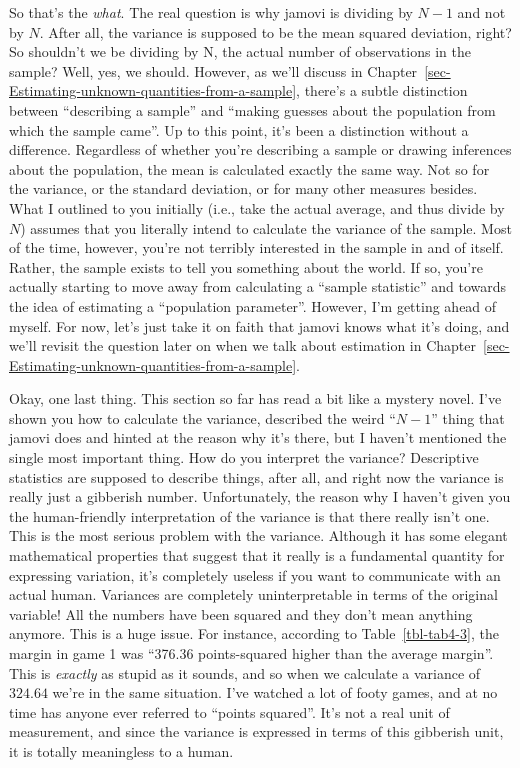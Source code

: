 \documentclass[
  a4paper,
]{book}
\begin{document}
So that's the \emph{what}. The real question is why jamovi is dividing
by \(N - 1\) and not by \(N\). After all, the variance is supposed to be
the mean squared deviation, right? So shouldn't we be dividing by N, the
actual number of observations in the sample? Well, yes, we should.
However, as we'll discuss in
Chapter~\ref{sec-Estimating-unknown-quantities-from-a-sample}, there's a
subtle distinction between ``describing a sample'' and ``making guesses
about the population from which the sample came''. Up to this point,
it's been a distinction without a difference. Regardless of whether
you're describing a sample or drawing inferences about the population,
the mean is calculated exactly the same way. Not so for the variance, or
the standard deviation, or for many other measures besides. What I
outlined to you initially (i.e., take the actual average, and thus
divide by \(N\)) assumes that you literally intend to calculate the
variance of the sample. Most of the time, however, you're not terribly
interested in the sample in and of itself. Rather, the sample exists to
tell you something about the world. If so, you're actually starting to
move away from calculating a ``sample statistic'' and towards the idea
of estimating a ``population parameter''. However, I'm getting ahead of
myself. For now, let's just take it on faith that jamovi knows what it's
doing, and we'll revisit the question later on when we talk about
estimation in
Chapter~\ref{sec-Estimating-unknown-quantities-from-a-sample}.

Okay, one last thing. This section so far has read a bit like a mystery
novel. I've shown you how to calculate the variance, described the weird
``\(N - 1\)'' thing that jamovi does and hinted at the reason why it's
there, but I haven't mentioned the single most important thing. How do
you interpret the variance? Descriptive statistics are supposed to
describe things, after all, and right now the variance is really just a
gibberish number. Unfortunately, the reason why I haven't given you the
human-friendly interpretation of the variance is that there really isn't
one. This is the most serious problem with the variance. Although it has
some elegant mathematical properties that suggest that it really is a
fundamental quantity for expressing variation, it's completely useless
if you want to communicate with an actual human. Variances are
completely uninterpretable in terms of the original variable! All the
numbers have been squared and they don't mean anything anymore. This is
a huge issue. For instance, according to Table~\ref{tbl-tab4-3}, the
margin in game 1 was ``376.36 points-squared higher than the average
margin''. This is \emph{exactly} as stupid as it sounds, and so when we
calculate a variance of \(324.64\) we're in the same situation. I've
watched a lot of footy games, and at no time has anyone ever referred to
``points squared''. It's not a real unit of measurement, and since the
variance is expressed in terms of this gibberish unit, it is totally
meaningless to a human.
\end{document}
